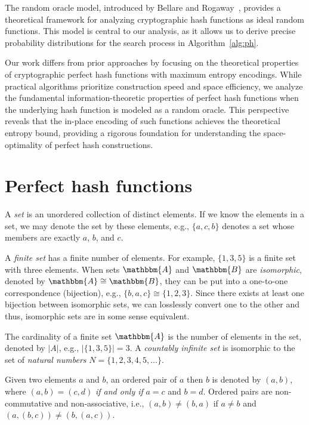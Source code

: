 \documentclass[hidelinks,11pt,final]{article}
\theoremstyle{plain}
\begin{document}
The random oracle model, introduced by Bellare and Rogaway~\cite{randomoracle}, provides a theoretical framework for analyzing cryptographic hash functions as ideal random functions. This model is central to our analysis, as it allows us to derive precise probability distributions for the search process in Algorithm~\ref{alg:ph}.

Our work differs from prior approaches by focusing on the theoretical properties of cryptographic perfect hash functions with maximum entropy encodings. While practical algorithms prioritize construction speed and space efficiency, we analyze the fundamental information-theoretic properties of perfect hash functions when the underlying hash function is modeled as a random oracle. This perspective reveals that the in-place encoding of such functions achieves the theoretical entropy bound, providing a rigorous foundation for understanding the space-optimality of perfect hash constructions.


\section{Perfect hash functions}
A \emph{set} is an unordered collection of distinct elements.
If we know the elements in a set, we may denote the set by these elements, e.g., $\{a,c,b\}$ denotes a set whose members are exactly $a$, $b$, and $c$.

A \emph{finite set} has a finite number of elements.
For example, $\{ 1, 3, 5 \}$ is a finite set with three elements.
When sets $\mathbbm{A}$ and $\mathbbm{B}$ are \emph{isomorphic}, denoted by $\mathbbm{A} 
\cong \mathbbm{B}$, they can be put into a one-to-one correspondence (bijection), e.g., $\{b,a,c\} \cong \{1,2,3\}$.
Since there exists at least one bijection between isomorphic sets, we can losslessly convert one to the other and thus, isomorphic sets are in some sense equivalent.

The cardinality of a finite set $\mathbbm{A}$ is the number of elements in the set, denoted by $|A|$, e.g., $|\{ 1, 3, 5\}| = 3$.
A \emph{countably infinite set} is isomorphic to the set of \emph{natural numbers} $N = \{1,2,3,4,5,\ldots\}$.

Given two elements $a$ and $b$, an ordered pair of $a$ then $b$ is denoted by $(a,b)$, where $(a,b) = (c,d)$ \emph{if and only if} $a = c$ and $b = d$.
Ordered pairs are non-commutative and non-associative, i.e., $(a,b) \neq (b,a)$ if $a \neq b$ and $(a,(b,c)) \neq (b,(a,c))$.
\end{document}
